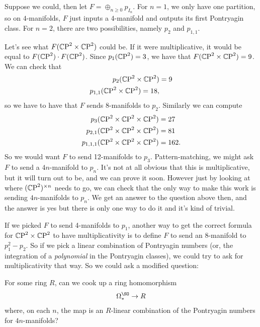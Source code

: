 \documentclass[11pt]{book}
\begin{document}
Suppose we could, then let $F = \oplus_{n\ge0} p_{I_n}$. For $n=1$, we only have one partition, so on $4$-manifolds, $F$ just inputs a $4$-manifold and outputs its first Pontryagin class. For $n=2$, there are two possibilities, namely $p_2$ and $p_{1,1}$.

Let's see what $F({\mathbb{C}\text{P}}^2 \times {\mathbb{C}\text{P}}^2)$ could be. If it were multiplicative, it would be equal to $F({\mathbb{C}\text{P}}^2) \cdot F({\mathbb{C}\text{P}}^2)$. Since $p_1({\mathbb{C}\text{P}}^2) = 3$, we have that $F({\mathbb{C}\text{P}}^2 \times {\mathbb{C}\text{P}}^2) = 9$. We can check that
\begin{align*}
    p_{2}({\mathbb{C}\text{P}}^2 \times {\mathbb{C}\text{P}}^2) &= 9 \\
    p_{1,1} ({\mathbb{C}\text{P}}^2 \times {\mathbb{C}\text{P}}^2) = 18,
\end{align*}
so we have to have that $F$ sends $8$-manifolds to $p_2$. Similarly we can compute
\begin{align*}
    p_3({\mathbb{C}\text{P}}^2 \times {\mathbb{C}\text{P}}^2 \times {\mathbb{C}\text{P}}^2) &= 27 \\
    p_{2,1}({\mathbb{C}\text{P}}^2 \times {\mathbb{C}\text{P}}^2 \times {\mathbb{C}\text{P}}^2) &= 81 \\
    p_{1,1,1}({\mathbb{C}\text{P}}^2 \times {\mathbb{C}\text{P}}^2 \times{\mathbb{C}\text{P}}^2) &= 162.
\end{align*}
So we would want $F$ to send 12-manifolds to $p_3$. Pattern-matching, we might ask $F$ to send a $4n$-manifold to $p_n$. It's not at all obvious that this is multiplicative, but it will turn out to be, and we can prove it soon. However just by looking at where $({\mathbb{C}\text{P}}^2)^{\times n}$ needs to go, we can check that the only way to make this work is sending $4n$-manifolds to $p_n$. We get an answer to the question above then, and the answer is yes but there is only one way to do it and it's kind of trivial.

If we picked $F$ to send 4-manifolds to $p_1$, another way to get the correct formula for ${\mathbb{C}\text{P}}^2 \times {\mathbb{C}\text{P}}^2$ to have multiplicativity is to define $F$ to send an 8-manifold to $p_1^2 - p_2$. So if we pick a linear combination of Pontryagin numbers (or, the integration of a \emph{polynomial} in the Pontryagin classes), we could try to ask for multiplicativity that way. So we could ask a modified question:

\begin{question} For some ring $R$, can we cook up a ring homomorphism
\begin{align*}
    \Omega_\ast^\SO \to R
\end{align*}
where, on each $n$, the map is an $R$-linear combination of the Pontryagin numbers for $4n$-manifolds?
\end{question}
\end{document}

